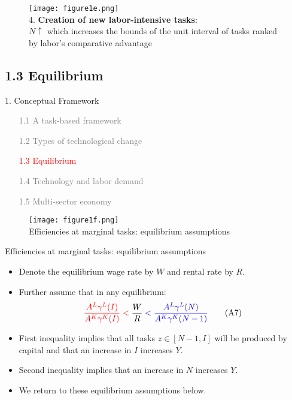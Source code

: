 \documentclass[notes=show]{beamer}
\begin{document}
\newpage
\begin{center}
\begin{figure}
\texttt{[image: figure1e.png]}
\\ 4. \textbf{Creation of new labor-intensive tasks}: \\
$N \uparrow $ which increases the bounds of the unit interval of tasks ranked by labor's comparative advantage
\end{figure} 
\end{center}
\newpage

\subsection{1.3 Equilibrium}

\begin{frame}{1. Conceptual Framework}
\begin{itemize}
\item[\textcolor{gray}{1.1}] \textcolor{gray}{A task-based framework} \bigskip
\item[\textcolor{gray}{1.2}] \textcolor{gray}{Types of technological change} \bigskip
\item[\textcolor{red}{1.3}] \textcolor{red}{Equilibrium} \bigskip
\item[\textcolor{gray}{1.4}] \textcolor{gray}{Technology and labor demand} \bigskip
\item[\textcolor{gray}{1.5}] \textcolor{gray}{Multi-sector economy} 
\end{itemize}
\end{frame}

\newpage
\begin{center}
\begin{figure}
\texttt{[image: figure1f.png]}
\\ Efficiencies at marginal tasks: equilibrium assumptions
\end{figure} 
\end{center}
\newpage

\begin{frame}{Efficiencies at marginal tasks: equilibrium assumptions}
\begin{itemize}
\item Denote the equilibrium wage rate by $W$ and rental rate by $R$. \medskip
\item Further assume that in any equilibrium:
\[
\color{red} \frac{A^{L}\gamma^{L}(I)}{A^{K}\gamma^{K}(I)} < \color{black} \frac{W}{R} \color{blue} < \frac{A^{L}\gamma^{L}(N)}{A^{K}\gamma^{K}(N-1)} \color{black} \tag{A7} \label{eqA7}
\]
\item First inequality implies that all tasks $z \in [N-1,I]$ will be produced by capital and that an increase in $I$ increases $Y$. \medskip
\item Second inequality implies that an increase in $N$ increases $Y$. \medskip
\item We return to these equilibrium assumptions below. 
\end{itemize}
\end{frame}
\end{document}
